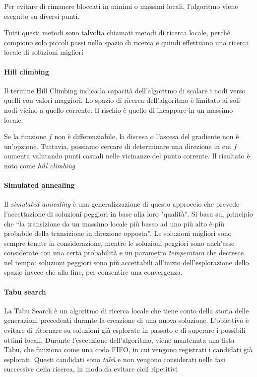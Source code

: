 Per evitare di rimanere bloccati in minimi o massimi locali, l'algoritmo viene eseguito su diversi punti. 

Tutti questi metodi sono talvolta chiamati metodi di ricerca locale, perché compiono solo piccoli passi nello spazio di ricerca e quindi effettuano una ricerca locale di soluzioni migliori

\paragraph{Hill climbing}
Il termine Hill Climbing indica la capacità dell'algoritmo di scalare i nodi verso quelli con valori maggiori. Lo spazio di ricerca dell'algoritmo è limitato ai soli nodi vicino a quello corrente. Il rischio è quello di incappare in un massimo locale.

Se la funzione $f$ non è differenziabile, la discesa o l'ascesa del gradiente non è un'opzione. Tuttavia, possiamo cercare di determinare una direzione in cui $f$ aumenta valutando punti casuali nelle vicinanze del punto corrente. Il risultato è noto come \textit{hill climbing}

\paragraph{Simulated annealing}
Il \textit{simulated annealing} è una generalizzazione di questo approccio che prevede l'accettazione di soluzioni peggiori in base alla loro "qualità". Si basa sul principio che “la transizione da un massimo locale più basso ad uno più alto è più probabile della transizione in direzione opposta”. Le soluzioni migliori sono sempre tenute in considerazione, mentre le soluzioni peggiori sono anch’esse considerate con una certa probabilità e un parametro \textit{temperatura} che decresce nel tempo: soluzioni peggiori sono più accettabili all’inizio dell’esplorazione dello spazio invece che alla fine, per consentire una convergenza.

\paragraph{Tabu search}
La Tabu Search è un algoritmo di ricerca locale che tiene conto della storia delle generazioni precedenti durante la creazione di una nuova soluzione. L'obiettivo è evitare di ritornare su soluzioni già esplorate in passato e di superare i possibili ottimi locali. Durante l'esecuzione dell'algoritmo, viene mantenuta una lista Tabu, che funziona come una coda FIFO, in cui vengono registrati i candidati già esplorati. Questi candidati sono \textit{tabù} e non vengono considerati nelle fasi successive della ricerca, in modo da evitare cicli ripetitivi

